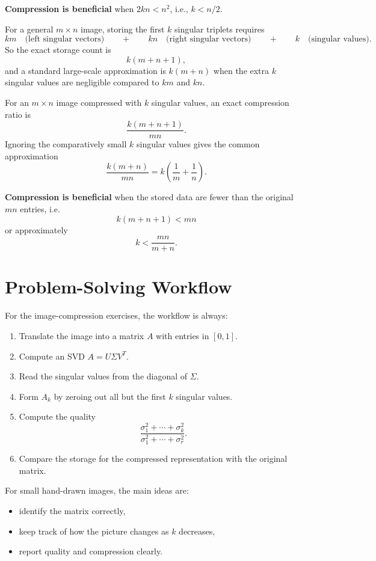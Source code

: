 \textbf{Compression is beneficial} when $2kn < n^2$, i.e., $k < n/2$.

For a general $m\times n$ image, storing the first $k$ singular triplets requires
\[
km \quad \text{(left singular vectors)} \qquad + \qquad kn \quad \text{(right singular vectors)} \qquad + \qquad k \quad \text{(singular values)}.
\]
So the exact storage count is
\[
k(m+n+1),
\]
and a standard large-scale approximation is $k(m+n)$ when the extra $k$ singular values are negligible compared to $km$ and $kn$.

\begin{definition}
For an $m\times n$ image compressed with $k$ singular values, an exact compression ratio is
\[
\frac{k(m+n+1)}{mn}.
\]
Ignoring the comparatively small $k$ singular values gives the common approximation
\[
\frac{k(m+n)}{mn}=k\left(\frac{1}{m}+\frac{1}{n}\right).
\]
\end{definition}

\textbf{Compression is beneficial} when the stored data are fewer than the original $mn$ entries, i.e.
\[
k(m+n+1)<mn
\]
or approximately
\[
k<\frac{mn}{m+n}.
\]

\section{Problem-Solving Workflow}

For the image-compression exercises, the workflow is always:
\begin{enumerate}
  \item Translate the image into a matrix $A$ with entries in $[0,1]$.
  \item Compute an SVD $A=U\Sigma V^T$.
  \item Read the singular values from the diagonal of $\Sigma$.
  \item Form $A_k$ by zeroing out all but the first $k$ singular values.
  \item Compute the quality
  \[
  \frac{\sigma_1^2+\cdots+\sigma_k^2}{\sigma_1^2+\cdots+\sigma_r^2}.
  \]
  \item Compare the storage for the compressed representation with the original matrix.
\end{enumerate}

For small hand-drawn images, the main ideas are:
\begin{itemize}
  \item identify the matrix correctly,
  \item keep track of how the picture changes as $k$ decreases,
  \item report quality and compression clearly.
\end{itemize}

